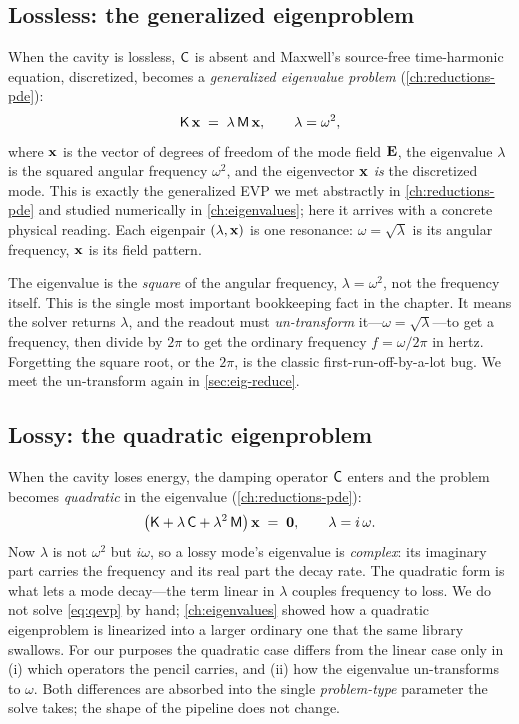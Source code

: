 \subsection{Lossless: the generalized eigenproblem}

When the cavity is lossless, $\mathsf{C}$ is absent and Maxwell's source-free
time-harmonic equation, discretized, becomes a \emph{generalized eigenvalue
problem} (\cref{ch:reductions-pde}):
\begin{equation}
  \mathsf{K}\,\mathbf{x} \;=\; \lambda\,\mathsf{M}\,\mathbf{x},
  \qquad \lambda = \omega^2,
  \label{eq:gevp}
\end{equation}
where $\mathbf{x}$ is the vector of degrees of freedom of the mode field $\mathbf{E}$, the
eigenvalue $\lambda$ is the squared angular frequency $\omega^2$, and the
eigenvector $\mathbf{x}$ \emph{is} the discretized mode. This is exactly the generalized
EVP we met abstractly in \cref{ch:reductions-pde} and studied numerically in
\cref{ch:eigenvalues}; here it arrives with a concrete physical reading. Each
eigenpair $(\lambda,\mathbf{x})$ is one resonance: $\omega=\sqrt\lambda$ is its angular
frequency, $\mathbf{x}$ is its field pattern.

\begin{notationbox}
The eigenvalue is the \emph{square} of the angular frequency, $\lambda=\omega^2$,
not the frequency itself. This is the single most important bookkeeping fact in
the chapter. It means the solver returns $\lambda$, and the readout must
\emph{un-transform} it---$\omega=\sqrt\lambda$---to get a frequency, then divide
by $2\pi$ to get the ordinary frequency $f=\omega/2\pi$ in hertz. Forgetting the
square root, or the $2\pi$, is the classic first-run-off-by-a-lot bug. We meet
the un-transform again in \cref{sec:eig-reduce}.
\end{notationbox}

\subsection{Lossy: the quadratic eigenproblem}

When the cavity loses energy, the damping operator $\mathsf{C}$ enters and the problem
becomes \emph{quadratic} in the eigenvalue (\cref{ch:reductions-pde}):
\begin{equation}
  \bigl(\mathsf{K} + \lambda\,\mathsf{C} + \lambda^2\,\mathsf{M}\bigr)\,\mathbf{x} \;=\; \mathbf 0,
  \qquad \lambda = i\,\omega.
  \label{eq:qevp}
\end{equation}
Now $\lambda$ is not $\omega^2$ but $i\omega$, so a lossy mode's eigenvalue is
\emph{complex}: its imaginary part carries the frequency and its real part the
decay rate. The quadratic form is what lets a mode decay---the term linear in
$\lambda$ couples frequency to loss. We do not solve \cref{eq:qevp} by hand;
\cref{ch:eigenvalues} showed how a quadratic eigenproblem is linearized into a
larger ordinary one that the same library swallows. For our purposes the
quadratic case differs from the linear case only in (i) which operators the
pencil carries, and (ii) how the eigenvalue un-transforms to $\omega$. Both
differences are absorbed into the single \emph{problem-type} parameter the solve
takes; the shape of the pipeline does not change.

